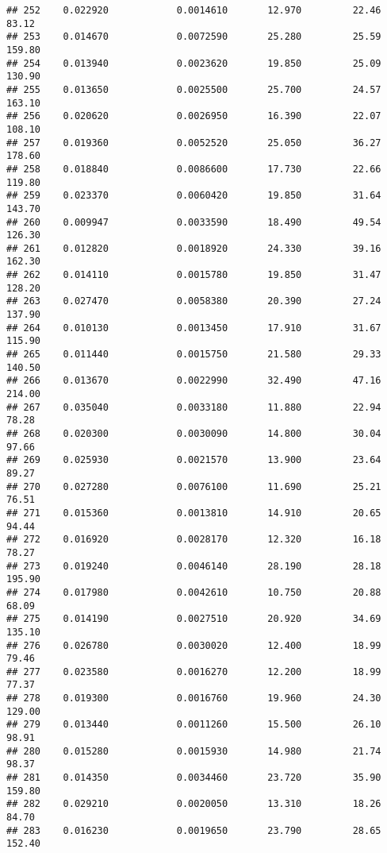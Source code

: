 \documentclass[
]{article}
\begin{document}
\begin{verbatim}
## 252    0.022920            0.0014610       12.970         22.46           83.12
## 253    0.014670            0.0072590       25.280         25.59          159.80
## 254    0.013940            0.0023620       19.850         25.09          130.90
## 255    0.013650            0.0025500       25.700         24.57          163.10
## 256    0.020620            0.0026950       16.390         22.07          108.10
## 257    0.019360            0.0052520       25.050         36.27          178.60
## 258    0.018840            0.0086600       17.730         22.66          119.80
## 259    0.023370            0.0060420       19.850         31.64          143.70
## 260    0.009947            0.0033590       18.490         49.54          126.30
## 261    0.012820            0.0018920       24.330         39.16          162.30
## 262    0.014110            0.0015780       19.850         31.47          128.20
## 263    0.027470            0.0058380       20.390         27.24          137.90
## 264    0.010130            0.0013450       17.910         31.67          115.90
## 265    0.011440            0.0015750       21.580         29.33          140.50
## 266    0.013670            0.0022990       32.490         47.16          214.00
## 267    0.035040            0.0033180       11.880         22.94           78.28
## 268    0.020300            0.0030090       14.800         30.04           97.66
## 269    0.025930            0.0021570       13.900         23.64           89.27
## 270    0.027280            0.0076100       11.690         25.21           76.51
## 271    0.015360            0.0013810       14.910         20.65           94.44
## 272    0.016920            0.0028170       12.320         16.18           78.27
## 273    0.019240            0.0046140       28.190         28.18          195.90
## 274    0.017980            0.0042610       10.750         20.88           68.09
## 275    0.014190            0.0027510       20.920         34.69          135.10
## 276    0.026780            0.0030020       12.400         18.99           79.46
## 277    0.023580            0.0016270       12.200         18.99           77.37
## 278    0.019300            0.0016760       19.960         24.30          129.00
## 279    0.013440            0.0011260       15.500         26.10           98.91
## 280    0.015280            0.0015930       14.980         21.74           98.37
## 281    0.014350            0.0034460       23.720         35.90          159.80
## 282    0.029210            0.0020050       13.310         18.26           84.70
## 283    0.016230            0.0019650       23.790         28.65          152.40

\end{verbatim}
\end{document}
